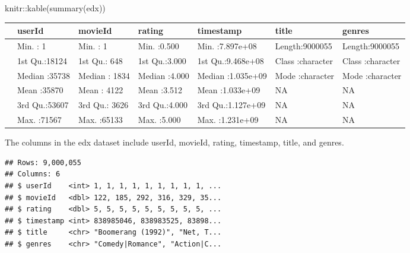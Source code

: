 \documentclass[
]{article}
\newenvironment{Shaded}{\begin{snugshade}}{\end{snugshade}}
\newcommand{\FunctionTok}[1]{\textcolor[rgb]{0.00,0.00,0.00}{#1}}
\newcommand{\NormalTok}[1]{#1}
\newcommand{\SpecialCharTok}[1]{\textcolor[rgb]{0.00,0.00,0.00}{#1}}
\begin{document}
\begin{Shaded}
\begin{Highlighting}[]
\NormalTok{knitr}\SpecialCharTok{::}\FunctionTok{kable}\NormalTok{(}\FunctionTok{summary}\NormalTok{(edx))           }
\end{Highlighting}
\end{Shaded}

\begin{longtable}[]{@{}
  >{\raggedright\arraybackslash}p{}
  >{\raggedright\arraybackslash}p{}
  >{\raggedright\arraybackslash}p{}
  >{\raggedright\arraybackslash}p{}
  >{\raggedright\arraybackslash}p{}
  >{\raggedright\arraybackslash}p{}
  >{\raggedright\arraybackslash}p{}@{}}
\toprule
& userId & movieId & rating & timestamp & title & genres \\
\midrule
\endhead
& Min. : 1 & Min. : 1 & Min. :0.500 & Min. :7.897e+08 & Length:9000055 &
Length:9000055 \\
& 1st Qu.:18124 & 1st Qu.: 648 & 1st Qu.:3.000 & 1st Qu.:9.468e+08 &
Class :character & Class :character \\
& Median :35738 & Median : 1834 & Median :4.000 & Median :1.035e+09 &
Mode :character & Mode :character \\
& Mean :35870 & Mean : 4122 & Mean :3.512 & Mean :1.033e+09 & NA & NA \\
& 3rd Qu.:53607 & 3rd Qu.: 3626 & 3rd Qu.:4.000 & 3rd Qu.:1.127e+09 & NA
& NA \\
& Max. :71567 & Max. :65133 & Max. :5.000 & Max. :1.231e+09 & NA & NA \\
\bottomrule
\end{longtable}

The columns in the edx dataset include userId, movieId, rating,
timestamp, title, and genres.

\begin{verbatim}
## Rows: 9,000,055
## Columns: 6
## $ userId    <int> 1, 1, 1, 1, 1, 1, 1, 1, 1, ...
## $ movieId   <dbl> 122, 185, 292, 316, 329, 35...
## $ rating    <dbl> 5, 5, 5, 5, 5, 5, 5, 5, 5, ...
## $ timestamp <int> 838985046, 838983525, 83898...
## $ title     <chr> "Boomerang (1992)", "Net, T...
## $ genres    <chr> "Comedy|Romance", "Action|C...
\end{verbatim}
\end{document}
